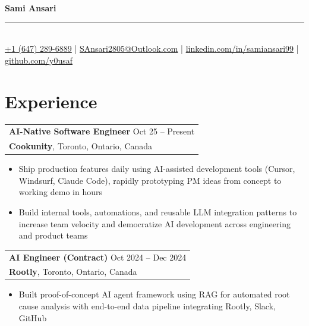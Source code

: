 \documentclass[letterpaper,10pt]{article}
\makeatletter
\newenvironment{resumeitemize}{
  \begin{itemize}[leftmargin=0.5in, itemsep=-1pt, topsep=1pt, labelsep=0.035in]
}{
  \end{itemize}
}
\newcommand{\experience}[4]{
  \begin{tabular}[t]{@{}p{6.5in}@{}}
    {\large\bfseries #1} \hfill {\small #2} \\
    {\bfseries #3}, #4
  \end{tabular}
}
\newcommand{\sectionspace}{\vspace{2pt}}
\makeatother
\begin{document}
\begin{center}
{\LARGE\bfseries Sami Ansari} \\
\vspace{1pt}
{\rule{0.3\textwidth}{0.5pt}} \\
\vspace{2pt}
\small \href{tel:+16472896889}{+1 (647) 289-6889} \enspace | \enspace \href{mailto:SAnsari2805@Outlook.com}{SAnsari2805@Outlook.com} \enspace | \enspace \href{https://linkedin.com/in/samiansari99/}{linkedin.com/in/samiansari99} \enspace | \enspace \href{https://github.com/y0usaf}{github.com/y0usaf}
\end{center}
\vspace{-6pt}

\section{Experience}

\hspace{0.15in} \experience{AI-Native Software Engineer}{Oct 25 -- Present}{Cookunity}{Toronto, Ontario, Canada}
\begin{resumeitemize}
\item Ship production features daily using AI-assisted development tools (Cursor, Windsurf, Claude Code), rapidly prototyping PM ideas from concept to working demo in hours
\item Build internal tools, automations, and reusable LLM integration patterns to increase team velocity and democratize AI development across engineering and product teams
\end{resumeitemize}
\sectionspace

\hspace{0.15in} \experience{AI Engineer (Contract)}{Oct 2024 -- Dec 2024}{Rootly}{Toronto, Ontario, Canada}
\begin{resumeitemize}
\item Built proof-of-concept AI agent framework using RAG for automated root cause analysis with end-to-end data pipeline integrating Rootly, Slack, GitHub
\end{resumeitemize}
\sectionspace
\end{document}
